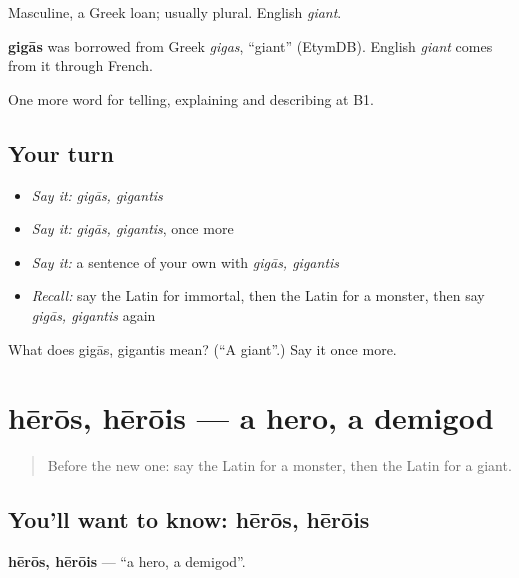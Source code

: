Masculine, a Greek loan; usually plural. English \emph{giant}.

\begin{cousinweb}
\textbf{gigās} was borrowed from Greek \emph{gigas}, \textquotedblleft{}giant\textquotedblright{} (EtymDB). English \emph{giant} comes from it through French.
\end{cousinweb}

\begin{grammarlens}[title={What you've built}]
One more word for telling, explaining and describing at B1.
\end{grammarlens}

\subsection*{Your turn}
\begin{itemize}
\raggedright
  \item \emph{Say it:} \emph{gigās, gigantis}
  \item \emph{Say it:} \emph{gigās, gigantis}, once more
  \item \emph{Say it:} a sentence of your own with \emph{gigās, gigantis}
  \item \emph{Recall:} say the Latin for immortal, then the Latin for a monster, then say \emph{gigās, gigantis} again
\end{itemize}

\begin{tcolorbox}[breakable,colback=teal!4,colframe=teal!35!black,title={Before you move on}]
What does gigās, gigantis mean? (\textquotedblleft{}A giant\textquotedblright{}.) Say it once more.
\end{tcolorbox}
\section[hērōs, hērōis]{hērōs, hērōis — a hero, a demigod}

\label{lesson:LA-C347-heros}



\begin{quote}
Before the new one: say the Latin for a monster, then the Latin for a giant.
\end{quote}

\subsection*{You'll want to know: hērōs, hērōis}
\textbf{hērōs, hērōis} — \textquotedblleft{}a hero, a demigod\textquotedblright{}.

